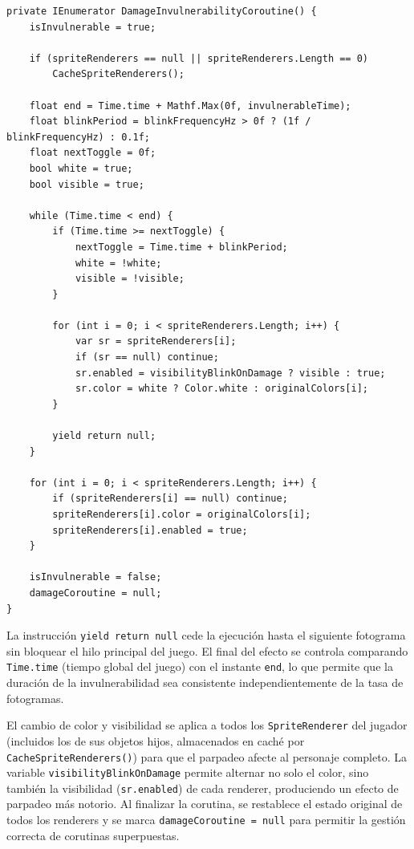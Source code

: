 \begin{lstlisting}
private IEnumerator DamageInvulnerabilityCoroutine() {
    isInvulnerable = true;

    if (spriteRenderers == null || spriteRenderers.Length == 0)
        CacheSpriteRenderers();

    float end = Time.time + Mathf.Max(0f, invulnerableTime);
    float blinkPeriod = blinkFrequencyHz > 0f ? (1f / blinkFrequencyHz) : 0.1f;
    float nextToggle = 0f;
    bool white = true;
    bool visible = true;

    while (Time.time < end) {
        if (Time.time >= nextToggle) {
            nextToggle = Time.time + blinkPeriod;
            white = !white;
            visible = !visible;
        }

        for (int i = 0; i < spriteRenderers.Length; i++) {
            var sr = spriteRenderers[i];
            if (sr == null) continue;
            sr.enabled = visibilityBlinkOnDamage ? visible : true;
            sr.color = white ? Color.white : originalColors[i];
        }

        yield return null;
    }

    for (int i = 0; i < spriteRenderers.Length; i++) {
        if (spriteRenderers[i] == null) continue;
        spriteRenderers[i].color = originalColors[i];
        spriteRenderers[i].enabled = true;
    }

    isInvulnerable = false;
    damageCoroutine = null;
}
\end{lstlisting}


La instrucción \texttt{yield return null} cede la ejecución hasta el siguiente fotograma sin bloquear el hilo principal del juego. El final del efecto se controla comparando \texttt{Time.time} (tiempo global del juego) con el instante \texttt{end}, lo que permite que la duración de la invulnerabilidad sea consistente independientemente de la tasa de fotogramas.

El cambio de color y visibilidad se aplica a todos los \texttt{SpriteRenderer} del jugador (incluidos los de sus objetos hijos, almacenados en caché por \texttt{CacheSpriteRenderers()}) para que el parpadeo afecte al personaje completo. La variable \texttt{visibilityBlinkOnDamage} permite alternar no solo el color, sino también la visibilidad (\texttt{sr.enabled}) de cada renderer, produciendo un efecto de parpadeo más notorio. Al finalizar la corutina, se restablece el estado original de todos los renderers y se marca \texttt{damageCoroutine = null} para permitir la gestión correcta de corutinas superpuestas.

